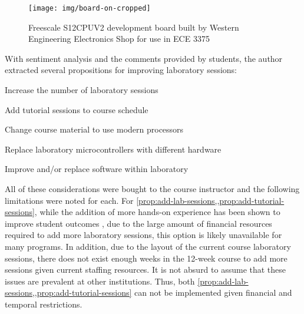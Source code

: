 \begin{figure}[!hb]
    \centering
    \texttt{[image: img/board-on-cropped]}
    \caption{Freescale S12CPUV2 development board built by Western Engineering Electronics Shop for use in ECE 3375}
    \label{fig:hc12-board}
\end{figure}

With sentiment analysis and the comments provided by students, the author extracted several propositions for improving laboratory sessions: 

\begin{propositions}%
    \item Increase the number of laboratory sessions 
        \label{prop:add-lab-sessions}
    \item Add tutorial sessions to course schedule
        \label{prop:add-tutorial-sessions}
    \item Change course material to use modern processors
        \label{prop:change-course-materials}
    \item Replace laboratory microcontrollers with different hardware
        \label{prop:replace-hardware} %
    \item Improve and/or replace software within laboratory
        \label{prop:replace-software}
\end{propositions}

All of these considerations were bought to the course instructor and the following limitations were noted for each. For \cref{prop:add-lab-sessions,,prop:add-tutorial-sessions}, while the addition of more hands-on experience has been shown to improve student outcomes \cite{Ristov2011, Stolikj2011}, due to the large amount of financial resources required to add more laboratory sessions, this option is likely unavailable for many programs. In addition, due to the layout of the current course laboratory sessions, there does not exist enough weeks in the 12-week course to add more sessions given current staffing resources. It is not absurd to assume that these issues are prevalent at other institutions. Thus, both \cref{prop:add-lab-sessions,,prop:add-tutorial-sessions} can not be implemented given financial and temporal restrictions.

